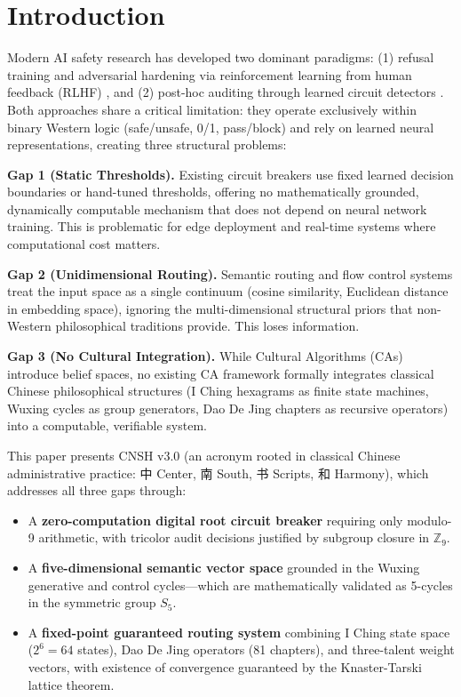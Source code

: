 \documentclass[twocolumn]{article}
\begin{document}
\section{Introduction}

Modern AI safety research has developed two dominant paradigms: (1) refusal training and adversarial hardening via reinforcement learning from human feedback (RLHF) \cite{Christiano2023,Ouyang2022}, and (2) post-hoc auditing through learned circuit detectors \cite{Zou2024}. Both approaches share a critical limitation: they operate exclusively within binary Western logic (safe/unsafe, 0/1, pass/block) and rely on learned neural representations, creating three structural problems:

\textbf{Gap 1 (Static Thresholds).} Existing circuit breakers use fixed learned decision boundaries or hand-tuned thresholds, offering no mathematically grounded, dynamically computable mechanism that does not depend on neural network training. This is problematic for edge deployment and real-time systems where computational cost matters.

\textbf{Gap 2 (Unidimensional Routing).} Semantic routing and flow control systems treat the input space as a single continuum (cosine similarity, Euclidean distance in embedding space), ignoring the multi-dimensional structural priors that non-Western philosophical traditions provide. This loses information.

\textbf{Gap 3 (No Cultural Integration).} While Cultural Algorithms (CAs) \cite{Reynolds1994,Reynolds2005} introduce belief spaces, no existing CA framework formally integrates classical Chinese philosophical structures (I Ching hexagrams as finite state machines, Wuxing cycles as group generators, Dao De Jing chapters as recursive operators) into a computable, verifiable system.

This paper presents CNSH v3.0 (an acronym rooted in classical Chinese administrative practice: 中 Center, 南 South, 书 Scripts, 和 Harmony), which addresses all three gaps through:

\begin{itemize}
  \item A \textbf{zero-computation digital root circuit breaker} requiring only modulo-9 arithmetic, with tricolor audit decisions justified by subgroup closure in $\mathbb{Z}_9$.
  \item A \textbf{five-dimensional semantic vector space} grounded in the Wuxing generative and control cycles—which are mathematically validated as 5-cycles in the symmetric group $S_5$.
  \item A \textbf{fixed-point guaranteed routing system} combining I Ching state space ($2^6 = 64$ states), Dao De Jing operators (81 chapters), and three-talent weight vectors, with existence of convergence guaranteed by the Knaster-Tarski lattice theorem.
\end{itemize}
\end{document}
